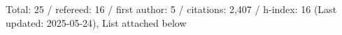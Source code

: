 Total: 25 / refereed: 16 / first author: 5 / citations: 2,407 / h-index: 16 (Last updated: 2025-05-24), List attached below